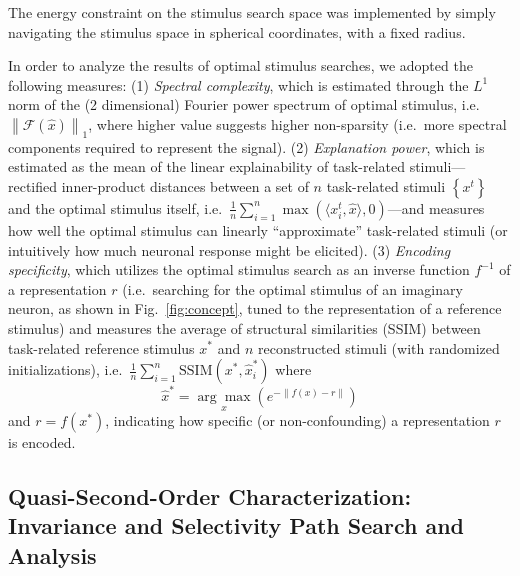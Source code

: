 The energy constraint on the stimulus search space was implemented by simply navigating the stimulus space in spherical coordinates, with a fixed radius.

In order to analyze the results of optimal stimulus searches, we adopted the following measures: (1) \emph{Spectral complexity}, which is estimated through the $L^{1}$ norm of the (2 dimensional) Fourier power spectrum of optimal stimulus, i.e.~$\left\| \mathcal{F}(\hat{x}) \right\|_{1}$, where higher value suggests higher non-sparsity (i.e.~more spectral components required to represent the signal). (2) \emph{Explanation power}, which is estimated as the mean of the linear explainability of task-related stimuli---rectified inner-product distances between a set of $n$ task-related stimuli $\left\lbrace x^{t} \right\rbrace$ and the optimal stimulus itself, i.e.~$\frac{1}{n}\sum_{i=1}^{n}\max\left(\langle x^{t}_{i} , \hat{x} \rangle , 0\right)$---and measures how well the optimal stimulus can linearly ``approximate'' task-related stimuli (or intuitively how much neuronal response might be elicited). (3) \emph{Encoding specificity}, which utilizes the optimal stimulus search as an inverse function $f^{-1}$ of a representation $r$ (i.e.~searching for the optimal stimulus of an imaginary neuron, as shown in Fig.~\ref{fig:concept}, tuned to the representation of a reference stimulus) and measures the average of structural similarities (SSIM) \cite{wang2004image} between task-related reference stimulus $x^{*}$ and $n$ reconstructed stimuli (with randomized initializations), i.e.~$\frac{1}{n}\sum_{i=1}^{n} \mathrm{SSIM}\left(x^{*} , \hat{x}^{*}_{i} \right)$ where \begin{equation} \label{eq:O2} \hat{x}^{*} = \underset{x}{\arg\max} \left( e^{-\left\|f\left(x\right)-r\right\|} \right) \end{equation} and $r = f\left(x^{*}\right)$, indicating how specific (or non-confounding) a representation $r$ is encoded.


\subsection*{Quasi-Second-Order Characterization: Invariance and Selectivity Path Search and Analysis}

